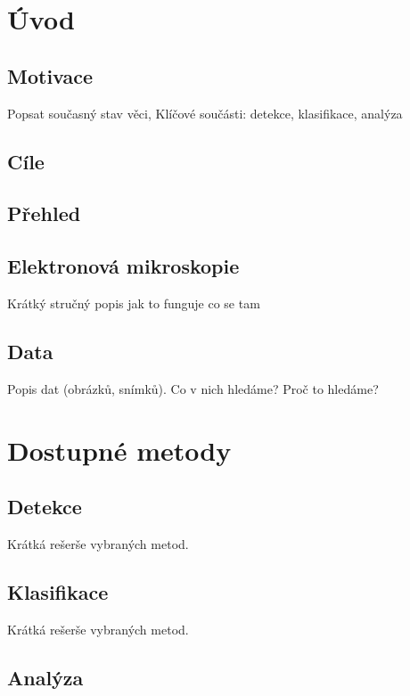 \documentclass[11pt,twoside,a4paper]{book}
\begin{document}
\chapter{Úvod}

\section{Motivace}
Popsat současný stav věci, 
Klíčové součásti: detekce, klasifikace, analýza

\section{Cíle}

\section{Přehled}

\section{Elektronová mikroskopie}
Krátký stručný popis jak to funguje co se tam 

\section{Data}
Popis dat (obrázků, snímků). Co v nich hledáme? Proč to hledáme?

\chapter{Dostupné metody}

\section{Detekce}
Krátká rešerše vybraných metod.

\section{Klasifikace}
Krátká rešerše vybraných metod.

\section{Analýza}
\end{document}
